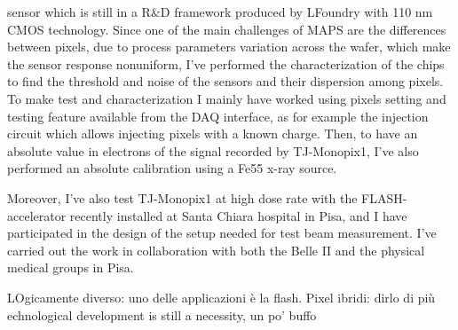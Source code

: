 \documentclass[a4paper]{report}
\begin{document}
 
 sensor which is still in a R$\&$D framework produced by LFoundry with 110 nm CMOS technology. 
Since one of the main challenges of MAPS are the differences between pixels, due to process parameters variation across the wafer, which make the sensor response nonuniform, I've performed the characterization of the chips to find the threshold and noise of the sensors and their dispersion among pixels. To make test and characterization I mainly have worked using pixels setting and testing feature available from the DAQ interface, as for example the injection circuit which allows injecting pixels with a known charge. Then, to have an absolute value in electrons of the signal recorded by TJ-Monopix1, I've also performed an absolute calibration using a Fe55 x-ray source. 

Moreover, I've also test TJ-Monopix1 at high dose rate with the FLASH-accelerator recently installed at Santa Chiara hospital in Pisa, and I have participated in the design of the setup needed for test beam measurement.
I've carried out the work in collaboration with both the Belle II and the physical medical groups in Pisa.

LOgicamente diverso: uno delle applicazioni è la flash.
Pixel ibridi: dirlo di più
echnological development is still a necessity, un po' buffo
\end{document}
